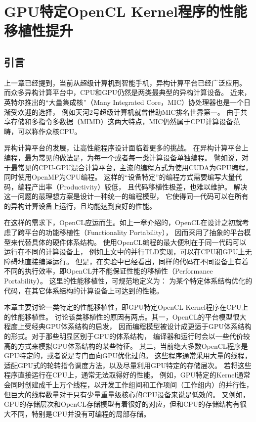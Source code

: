 \chapter{GPU特定OpenCL Kernel程序的性能移植性提升}
\section{引言}
上一章已经提到，当前从超级计算机到智能手机，异构计算平台已经广泛应用。
而众多异构计算平台中，CPU和GPU仍然是两类最典型的异构计算设备。
近来，英特尔推出的``大量集成核''（Many Integrated Core，MIC）协处理器也是一个日渐受欢迎的选择，
例如天河2号超级计算机就曾借助MIC排名世界第一。
由于共享存储和多指令多数据（MIMD）这两大特点，MIC仍然属于CPU计算设备范畴，可以称作众核CPU。

异构计算平台的发展，让高性能程序设计面临着更多的挑战。
在异构计算平台上编程，最为常见的做法是，为每一个或者每一类计算设备单独编程。
譬如说，对于最常见的CPU-GPU混合计算平台，主流的编程方式为使用CUDA为GPU编程，
同时使用OpenMP为CPU编程。
这样的``设备特定''的编程方式需要编写大量代码，编程产出率（Productivity）较低，
且代码移植性极差，也难以维护。
解决这一问题的最理想方案是设计一种统一的编程模型，
它使得同一代码可以在所有的异构计算设备上运行，且均能达到良好的性能。

在这样的需求下，OpenCL应运而生。如上一章介绍的，OpenCL在设计之初就考虑了跨平台的功能移植性（Functionality Portability），
因而采用了抽象的平台模型来代替具体的硬件体系结构。
使用OpenCL编程的最大便利在于同一代码可以运行在不同的计算设备上，
例如上文中的并行TLD实现，可以在CPU和GPU上无障碍地直接编译运行。
但是，在实验中已经看出，同样的代码在不同设备上有着不同的执行效率，即OpenCL并不能保证性能的移植性（Performance Portability）。
这里的性能移植性，可规范地定义为：
为某个特定体系结构优化的代码，在其它体系结构的计算设备上可达到的性能。

本章主要讨论一类特定的性能移植性，即GPU特定OpenCL Kernel程序在CPU上的性能移植性。
讨论该类移植性的原因有两点。其一，OpenCL的平台模型很大程度上受经典GPU体系结构的启发，
因而编程模型被设计成更适于GPU体系结构的形式。对于那些明显区别于GPU的体系结构，
编译器和运行时会以一些代价较高的方式来模拟GPU体系结构的某些特征。
其二，当前绝大多数OpenCL程序是GPU特定的，或者说是专门面向GPU优化过的。
这些程序通常采用大量的线程，适配GPU式的轮转指令调度方法，以及尽量利用GPU特定的存储层次。
若将这些程序直接运行在CPU上，通常无法取得好的性能。
例如，GPU特定的Kernel通常会同时创建成千上万个线程，以开发工作组间和工作项间（工作组内）的并行性，
但巨大的线程数量对于只有少量重量级核心的CPU设备来说是低效的。
又例如，GPU的存储层次和OpenCL存储模型有着很好的对应，但和CPU的存储结构有很大不同，特别是CPU并没有可编程的局部存储。

